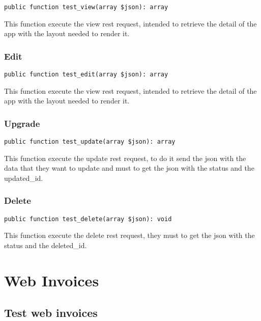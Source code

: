 \documentclass[a4paper]{article}
\begin{document}
\begin{lstlisting}
public function test_view(array $json): array
\end{lstlisting}

This function execute the view rest request, intended to retrieve the detail
of the app with the layout needed to render it.

\hypertarget{toc434}{}
\subsubsection{Edit}

\begin{lstlisting}
public function test_edit(array $json): array
\end{lstlisting}

This function execute the view rest request, intended to retrieve the detail
of the app with the layout needed to render it.

\hypertarget{toc435}{}
\subsubsection{Upgrade}

\begin{lstlisting}
public function test_update(array $json): array
\end{lstlisting}

This function execute the update rest request, to do it send the json with
the data that they want to update and must to get the json with the status
and the updated\_id.

\hypertarget{toc436}{}
\subsubsection{Delete}

\begin{lstlisting}
public function test_delete(array $json): void
\end{lstlisting}

This function execute the delete rest request, they must to get the json
with the status and the deleted\_id.


\hypertarget{toc437}{}
\section{Web Invoices}

\hypertarget{toc438}{}
\subsection{Test web invoices}
\end{document}
